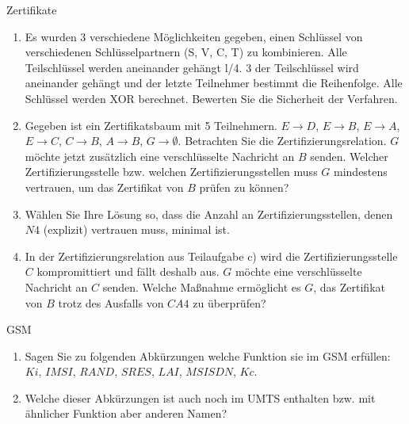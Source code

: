 \documentclass{article}
\begin{document}
\begin{exercise}{Zertifikate}
  \begin{enumerate}
    \item Es wurden 3 verschiedene Möglichkeiten gegeben, einen Schlüssel von verschiedenen Schlüsselpartnern (S, V, C, T) zu kombinieren. Alle Teilschlüssel werden aneinander gehängt l/4. 3 der Teilschlüssel wird aneinander gehängt und der letzte Teilnehmer bestimmt die Reihenfolge. Alle Schlüssel werden XOR berechnet. Bewerten Sie die Sicherheit der Verfahren.
    \item Gegeben ist ein Zertifikatsbaum mit 5 Teilnehmern. $E \rightarrow D$, $E \rightarrow B$, $E \rightarrow A$, $E \rightarrow C$, $C \rightarrow B$, $A \rightarrow B$, $G \rightarrow \emptyset$. Betrachten Sie die Zertifizierungsrelation. $G$ möchte jetzt zusätzlich eine verschlüsselte Nachricht an $B$ senden. Welcher Zertifizierungsstelle bzw. welchen Zertifizierungsstellen muss $G$ mindestens vertrauen, um das Zertifikat von $B$ prüfen zu können?
    \item Wählen Sie Ihre Lösung so, dass die Anzahl an Zertifizierungsstellen, denen $N4$ (explizit) vertrauen muss, minimal ist.
    \item In der Zertifizierungsrelation aus Teilaufgabe c) wird die Zertifizierungsstelle $C$ kompromittiert und fällt deshalb aus. $G$ möchte eine verschlüsselte Nachricht an $C$ senden. Welche Maßnahme ermöglicht es $G$, das Zertifikat von $B$ trotz des Ausfalls von $CA4$ zu überprüfen?
  \end{enumerate}

  \begin{solution}
  \end{solution}
\end{exercise}

\begin{exercise}{GSM}
  \begin{enumerate}
    \item Sagen Sie zu folgenden Abkürzungen welche Funktion sie im GSM erfüllen: $Ki$, $IMSI$, $RAND$, $SRES$, $LAI$, $MSISDN$, $Kc$.
    \item Welche dieser Abkürzungen ist auch noch im UMTS enthalten bzw. mit ähnlicher Funktion aber anderen Namen?
  \end{enumerate}

  \begin{solution}
  \end{solution}
\end{exercise}
\end{document}

